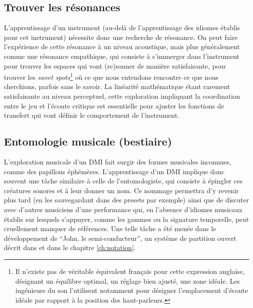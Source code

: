 \subsection{Trouver les résonances}

\noindent L'apprentissage d'un instrument (au-delà de l'apprentissage des idiomes établis pour cet instrument) nécessite donc une recherche de résonance. On peut faire l'expérience de cette résonance à un niveau acoustique, mais plus généralement comme une résonance empathique, qui consiste à s'immerger dans l'instrument pour trouver les espaces qui vont (re)sonner de manière satisfaisante, pour trouver les \textit{sweet spots}\footnote{Il n'existe pas de véritable équivalent français pour cette expression anglaise, désignant un équilibre optimal, un réglage bien ajusté, une zone idéale. Les ingénieurs du son l'utilisent notamment pour désigner l'emplacement d'écoute idéale par rapport à la position des haut-parleurs.} où ce que nous entendons rencontre ce que nous cherchions, parfois sans le savoir. La linéarité mathématique étant rarement satisfaisante au niveau perceptuel, cette exploration impliquant la coordination entre le jeu et l'écoute critique est essentielle pour ajuster les fonctions de transfert qui vont définir le comportement de l'instrument.

\subsection{Entomologie musicale (bestiaire)}

\noindent L'exploration musicale d'un \gls{DMI} fait surgir des formes musicales inconnues, comme des papillons éphémères. L'apprentissage d'un \gls{DMI} implique donc souvent une tâche similaire à celle de l'entomologiste, qui consiste à épingler ces créatures sonores et à leur donner un nom. Ce nommage permettra d'y revenir plus tard (en les sauvegardant dans des presets par exemple) ainsi que de discuter avec d'autres musiciens d'une performance qui, en l'absence d'idiomes musicaux établis sur lesquels s'appuyer, comme les gammes ou la signature temporelle, peut cruellement manquer de références. Une telle tâche a été menée dans le développement de ``John, le semi-conducteur'', un système de partition ouvert décrit dans \cite{goudard_john_2018} et dans le chapitre \ref{ch:notation}.\\


